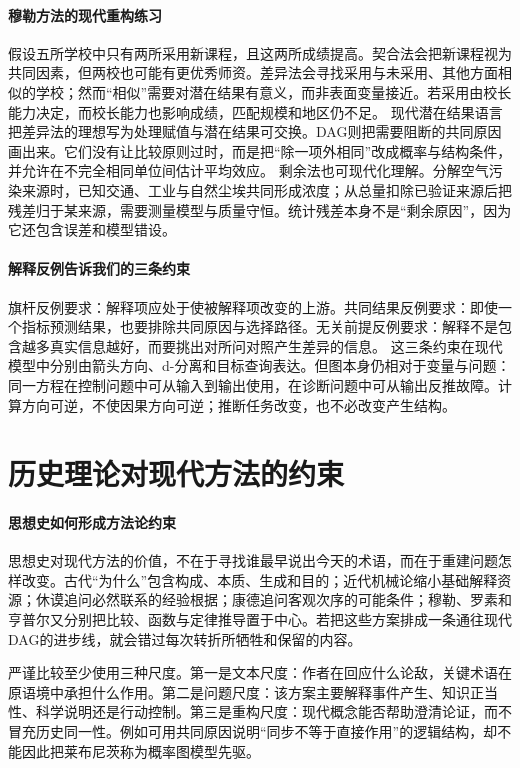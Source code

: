 \paragraph{穆勒方法的现代重构练习}

假设五所学校中只有两所采用新课程，且这两所成绩提高。契合法会把新课程视为共同因素，但两校也可能有更优秀师资。差异法会寻找采用与未采用、其他方面相似的学校；然而“相似”需要对潜在结果有意义，而非表面变量接近。若采用由校长能力决定，而校长能力也影响成绩，匹配规模和地区仍不足。
现代潜在结果语言把差异法的理想写为处理赋值与潜在结果可交换。DAG则把需要阻断的共同原因画出来。它们没有让比较原则过时，而是把“除一项外相同”改成概率与结构条件，并允许在不完全相同单位间估计平均效应。
剩余法也可现代化理解。分解空气污染来源时，已知交通、工业与自然尘埃共同形成浓度；从总量扣除已验证来源后把残差归于某来源，需要测量模型与质量守恒。统计残差本身不是“剩余原因”，因为它还包含误差和模型错设。

\paragraph{解释反例告诉我们的三条约束}

旗杆反例要求：解释项应处于使被解释项改变的上游。共同结果反例要求：即使一个指标预测结果，也要排除共同原因与选择路径。无关前提反例要求：解释不是包含越多真实信息越好，而要挑出对所问对照产生差异的信息。
这三条约束在现代模型中分别由箭头方向、d-分离和目标查询表达。但图本身仍相对于变量与问题：同一方程在控制问题中可从输入到输出使用，在诊断问题中可从输出反推故障。计算方向可逆，不使因果方向可逆；推断任务改变，也不必改变产生结构。

\section{历史理论对现代方法的约束}

\paragraph{思想史如何形成方法论约束}

思想史对现代方法的价值，不在于寻找谁最早说出今天的术语，而在于重建问题怎样改变。古代“为什么”包含构成、本质、生成和目的；近代机械论缩小基础解释资源；休谟追问必然联系的经验根据；康德追问客观次序的可能条件；穆勒、罗素和亨普尔又分别把比较、函数与定律推导置于中心。若把这些方案排成一条通往现代DAG的进步线，就会错过每次转折所牺牲和保留的内容。

严谨比较至少使用三种尺度。第一是文本尺度：作者在回应什么论敌，关键术语在原语境中承担什么作用。第二是问题尺度：该方案主要解释事件产生、知识正当性、科学说明还是行动控制。第三是重构尺度：现代概念能否帮助澄清论证，而不冒充历史同一性。例如可用共同原因说明“同步不等于直接作用”的逻辑结构，却不能因此把莱布尼茨称为概率图模型先驱。

